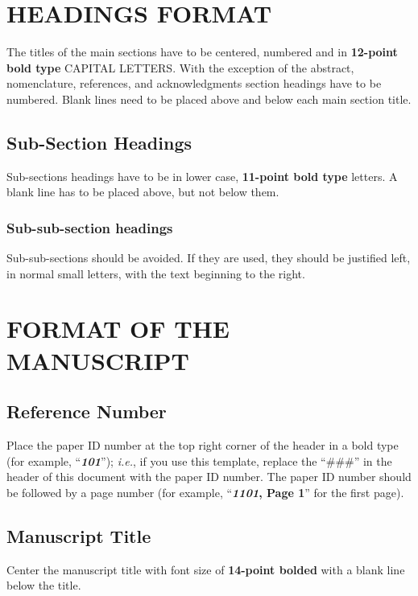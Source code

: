 \documentclass[10pt]{extarticle}
\begin{document}
\section{HEADINGS FORMAT}

The titles of the main sections have to be centered, numbered and in \textbf{12-point bold type} CAPITAL LETTERS.  With the exception of the abstract, nomenclature, references, and acknowledgments section headings have to be numbered. Blank lines need to be placed above and below each main section title.

\subsection{Sub-Section Headings}
Sub-sections headings have to be in lower case, \textbf{11-point bold type} letters.  A blank line has to be placed above, but not below them.

\subsubsection{Sub-sub-section headings} Sub-sub-sections should be avoided. If they are used, they should be justified left, in normal small letters, with the text beginning to the right.

\section{FORMAT OF THE MANUSCRIPT}

\subsection{Reference Number}
Place the paper ID number at the top right corner of the header in a bold type (for example, ``\textbf{\textit{101}}''); \textit{i.e.}, if you use this template, replace the ``\#\#\#'' in the header of this document with the paper ID number. The paper ID number should be followed by a page number (for example, ``\textbf{\textit{1101}, Page 1}'' for the first page). 

\subsection{Manuscript Title}
Center the manuscript title with font size of \textbf{14-point bolded} with a blank line below the title. 
\end{document}

